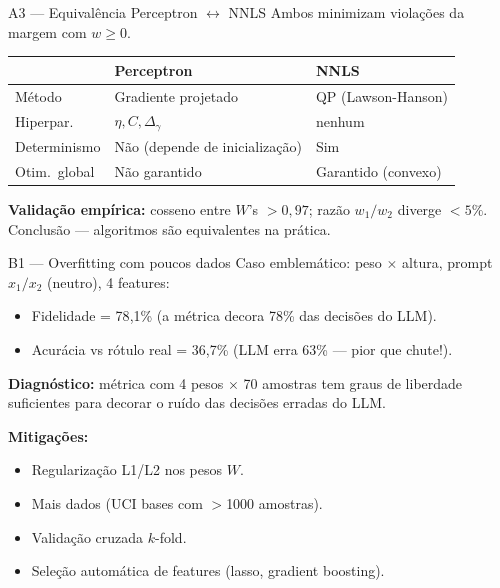 \documentclass[aspectratio=169,10pt]{beamer}
\begin{document}
\begin{frame}{A3 --- Equival\^encia Perceptron $\leftrightarrow$ NNLS}
  \scriptsize
  Ambos minimizam viola\c{c}\~oes da margem com $w \geq 0$.
  \begin{center}
  \begin{tabular}{lp{4cm}p{4cm}}
    \toprule
    & \textbf{Perceptron} & \textbf{NNLS} \\
    \midrule
    M\'etodo  & Gradiente projetado & QP (Lawson-Hanson) \\
    Hiperpar.\ & $\eta, C, \Delta_\gamma$ & nenhum \\
    Determinismo & N\~ao (depende de inicializa\c{c}\~ao) & Sim \\
    Otim.\ global & N\~ao garantido & Garantido (convexo) \\
    \bottomrule
  \end{tabular}
  \end{center}
  \medskip
  \textbf{Valida\c{c}\~ao emp\'irica:} cosseno entre $W$'s $> 0{,}97$; raz\~ao $w_1/w_2$ diverge $< 5\%$. Conclus\~ao --- algoritmos s\~ao equivalentes na pr\'atica.
\end{frame}

\begin{frame}{B1 --- Overfitting com poucos dados}
  \scriptsize
  Caso emblem\'atico: peso $\times$ altura, prompt $x_1/x_2$ (neutro), 4 features:
  \begin{itemize}
    \item Fidelidade = 78{,}1\% (a m\'etrica decora 78\% das decis\~oes do LLM).
    \item Acur\'acia vs r\'otulo real = 36{,}7\% (LLM erra 63\% --- pior que chute!).
  \end{itemize}
  \medskip
  \textbf{Diagn\'ostico:} m\'etrica com 4 pesos $\times$ 70 amostras tem graus de liberdade suficientes para decorar o ru\'ido das decis\~oes erradas do LLM.
  \medskip

  \textbf{Mitiga\c{c}\~oes:}
  \begin{itemize}
    \item Regulariza\c{c}\~ao L1/L2 nos pesos $W$.
    \item Mais dados (UCI bases com $>$1000 amostras).
    \item Valida\c{c}\~ao cruzada $k$-fold.
    \item Sele\c{c}\~ao autom\'atica de features (lasso, gradient boosting).
  \end{itemize}
\end{frame}
\end{document}
